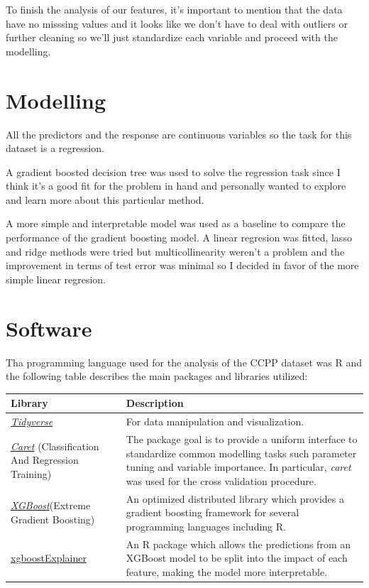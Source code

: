 To finish the analysis of our features, it's important to mention that the data have no misssing values and it looks like we don't have to deal with outliers or further cleaning so we'll just standardize each variable and proceed with the modelling.
\newpage

\section{Modelling}

All the predictors and the response are continuous variables so the task for this dataset is a regression.

A gradient boosted decision tree was used to solve the regression task since I think it's a good fit for the problem in hand and personally wanted to explore and learn more about this particular method.

A more simple and interpretable model was used as a baseline to compare the performance of the gradient boosting model. A linear regresion was fitted, lasso and ridge methods were tried but multicollinearity weren't a problem and the improvement in terms of test error was minimal so I decided in favor of the more simple linear regresion.

\section{Software}
Tha programming language used for the analysis of the CCPP dataset was R and the following table describes the main packages and libraries utilized:
\begin{center}
    \begin{tabular}{ |p{4cm}||p{10.5cm}|}
         \hline
         Library & Description \\
         \hline
         \href{https://www.tidyverse.org}{\textit{Tidyverse}} & For data manipulation and visualization. \\
         \href{http://topepo.github.io/caret/index.html}{\textit{Caret}} (Classification And Regression Training) &  The package goal is to provide a uniform interface to standardize common modelling tasks such parameter tuning and variable importance. In particular, \textit{caret} was used for the cross validation procedure.  \\
         \href{https://xgboost.ai/about}{\textit{XGBoost}}(Extreme Gradient Boosting) & An optimized distributed library which provides a gradient boosting framework for several programming languages including R. \\
         \href{https://www.rdocumentation.org/packages/xgboostExplainer/versions/0.1}{xgboostExplainer} & An R package which allows the predictions from an XGBoost model to be split into the impact of each feature, making the model more interpretable. \\
         \hline
    \end{tabular}
\end{center}

